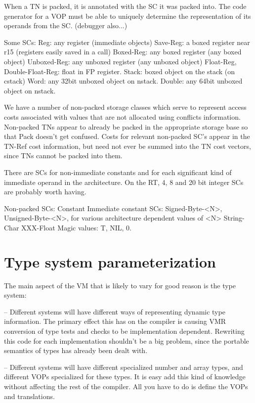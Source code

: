 When a TN is packed, it is annotated with the SC it was packed into.  The code
generator for a VOP must be able to uniquely determine the representation of
its operands from the SC. (debugger also...)

Some SCs:
    Reg: any register (immediate objects)
    Save-Reg: a boxed register near r15 (registers easily saved in a call)
    Boxed-Reg: any boxed register (any boxed object)
    Unboxed-Reg: any unboxed register (any unboxed object)
    Float-Reg, Double-Float-Reg: float in FP register.
    Stack: boxed object on the stack (on cstack)
    Word: any 32bit unboxed object on nstack.
    Double: any 64bit unboxed object on nstack.

We have a number of non-packed storage classes which serve to represent access
costs associated with values that are not allocated using conflicts
information.  Non-packed TNs appear to already be packed in the appropriate
storage base so that Pack doesn't get confused.  Costs for relevant non-packed
SC's appear in the TN-Ref cost information, but need not ever be summed into
the TN cost vectors, since TNs cannot be packed into them.

There are SCs for non-immediate constants and for each significant kind of
immediate operand in the architecture.  On the RT, 4, 8 and 20 bit integer SCs
are probably worth having.

Non-packed SCs:
    Constant
    Immediate constant SCs:
        Signed-Byte-<N>, Unsigned-Byte-<N>, for various architecture dependent
	    values of <N>
	String-Char
	XXX-Float
	Magic values: T, NIL, 0.


\chapter{Type system parameterization}

The main aspect of the VM that is likely to vary for good reason is the type
system:

 -- Different systems will have different ways of representing dynamic type
    information.  The primary effect this has on the compiler is causing VMR
    conversion of type tests and checks to be implementation dependent.
    Rewriting this code for each implementation shouldn't be a big problem,
    since the portable semantics of types has already been dealt with.

 -- Different systems will have different specialized number and array types,
    and different VOPs specialized for these types.  It is easy add this kind
    of knowledge without affecting the rest of the compiler.  All you have to
    do is define the VOPs and translations.

